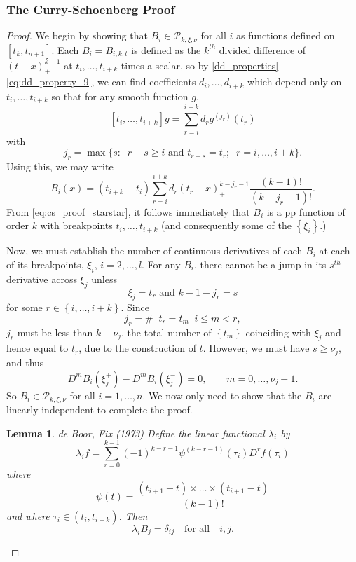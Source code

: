 \documentclass[12pt]{article}
\newcommand{\PP}{\mathcal{P}}
\newtheorem{lemma}[theorem]{Lemma}
\theoremstyle{definition}
\begin{document}
\subsubsection{The Curry-Schoenberg Proof}

\begin{proof}
We begin by showing that $B_i \in \PP_{k,\xi,\nu}$ for all $i$ as functions defined on $\left[t_k,t_{n+1}\right]$. Each $B_i = B_{i,k,t}$ is defined as the $k^{th}$ divided difference of $\left(t-x\right)_+^{k-1}$ at $t_i,\dots,t_{i+k}$ times a scalar, so by \ref{dd_properties} \ref{eq:dd_property_9}, we can find coefficients $d_i,\dots,d_{i+k}$ which depend only on $t_{i},\dots,t_{i+k}$ so that for any smooth function $g$, 
\begin{equation} \label{eq:cs_proof_star}
\left[t_i,\dots,t_{i+k} \right]g = \sum_{r=i}^{i+k} d_r g^{\left(j_r\right)}\left(t_r\right)
\end{equation}
with 
\[
j_r = \max \bigg\{s:\;\;r-s \ge i \mbox{ and } t_{r-s} = t_r;\;\;r=i,\dots,i+k\bigg\}.
\]
Using this, we may write 
\begin{equation} \label{eq:cs_proof_starstar}
B_i\left(x\right) = \left(t_{i+k}-t_i\right)\sum_{r=i}^{i+k} d_r \left(t_r - x\right)_+^{k-j_r-1}\frac{\left(k-1\right)!}{\left(k-j_r-1\right)!}.
\end{equation}
From \ref{eq:cs_proof_starstar}, it follows immediately that $B_i$ is a pp function of order $k$ with breakpoints $t_i,\dots,t_{i+k}$ (and consequently some of the $\left\{\xi_i\right\}$.)

Now, we must establish the number of continuous derivatives of each $B_i$ at each of its breakpoints, $\xi_i$, $i=2,\dots,l$. For any $B_i$, there cannot be a jump in its $s^{th}$ derivative across $\xi_j$ unless 
\[
\xi_j = t_r \mbox{ and } k-1-j_r = s
\]
for some $r \in \left\{ i,\dots,i+k \right\}$. Since 
\[
j_r = \# \;\; t_r = t_m \;\; i \le m < r,
\]
$j_r$ must be less than $k-\nu_j$, the total number of $\left\{t_m\right\}$ coinciding with $\xi_j$ and hence equal to $t_r$, due to the construction of $t$. However, we must have $s \ge \nu_j$, and thus
\[
D^mB_i\left(\xi_j^+\right) - D^mB_i\left(\xi_j^-\right) = 0, \qquad m=0,\dots, \nu_j -1.
\]
So $B_i \in \PP_{k,\xi,\nu}$ for all $i=1,\dots,n$. We now only need to show that the $B_i$ are linearly independent to complete the proof.

\begin{lemma}{de Boor, Fix (1973)} \label{deBoor_Fix_lemma}
Define the linear functional $\lambda_i$ by 
\[
\lambda_i f = \sum_{r=0}^{k-1} \left(-1\right)^{k-r-1} \psi^{\left(k-r-1\right)}\left(\tau_i\right)D^r f\left(\tau_i\right)
\]
where
\[
\psi\left( t \right) = \frac{\left(t_{i+1}-t\right)\times \dots \times \left(t_{i+1}-t\right)}{\left(k-1\right)!}
\]
and where $\tau_i \in \left(t_i,t_{i+k}\right)$. Then 
\[
\lambda_i B_j = \delta_{ij} \quad \mbox{for all} \quad i,j.
\]
\end{lemma}


\end{proof}
\end{document}
